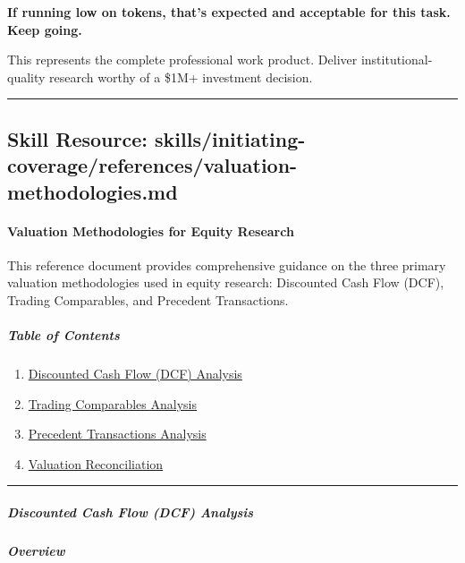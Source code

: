 \documentclass[11pt]{article}
\begin{document}
\textbf{If running low on tokens, that's expected and acceptable for this task. Keep going.}


This represents the complete professional work product. Deliver institutional-quality research worthy of a \$1M+ investment decision.


\vspace{0.8em}\hrule\vspace{0.8em}

\subsection{Skill Resource: skills/initiating-coverage/references/valuation-methodologies.md}\label{file:skills-initiating-coverage-references-valuation-methodologies-md}

\paragraph{Valuation Methodologies for Equity Research}\mbox{}\par

This reference document provides comprehensive guidance on the three primary valuation methodologies used in equity research: Discounted Cash Flow (DCF), Trading Comparables, and Precedent Transactions.


\subparagraph{Table of Contents}\mbox{}\par

\begin{enumerate}[leftmargin=*,itemsep=2pt,topsep=2pt]
\item {} \href{\#discounted-cash-flow-dcf-analysis}{Discounted Cash Flow (DCF) Analysis}
\item {} \href{\#trading-comparables-analysis}{Trading Comparables Analysis}
\item {} \href{\#precedent-transactions-analysis}{Precedent Transactions Analysis}
\item {} \href{\#valuation-reconciliation}{Valuation Reconciliation}
\end{enumerate}

\vspace{0.5em}\hrule\vspace{0.5em}

\subparagraph{Discounted Cash Flow (DCF) Analysis}\mbox{}\par

\subparagraph{Overview}\mbox{}\par
\end{document}
